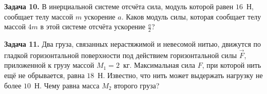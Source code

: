 \begin{taskbasic}[code={\label{task:newton2_v30_n2}}]
\textbf{Задача 10.} В инерциальной системе отсчёта сила, модуль которой равен $16$~Н, сообщает телу массой $m$ ускорение $a$. Каков модуль силы, которая сообщает телу массой $4m$ в этой системе отсчёта ускорение $\frac{a}{2}$?

\end{taskbasic}

\begin{taskbasic}[code={\label{task:newton2_v30_n22}}]
\textbf{Задача 11.} Два груза, связанных нерастяжимой и невесомой нитью, движутся по гладкой горизонтальной поверхности под действием горизонтальной силы $\vec{F}$, приложенной к грузу массой $M_1 = 2$~кг. Максимальная сила $F$, при которой нить ещё не обрывается, равна $18$~Н. Известно, что нить может выдержать нагрузку не более $10$~Н. Чему равна масса $M_2$ второго груза?
\nopagebreak\smallskip
\begin{center}
\end{center}

\end{taskbasic}

